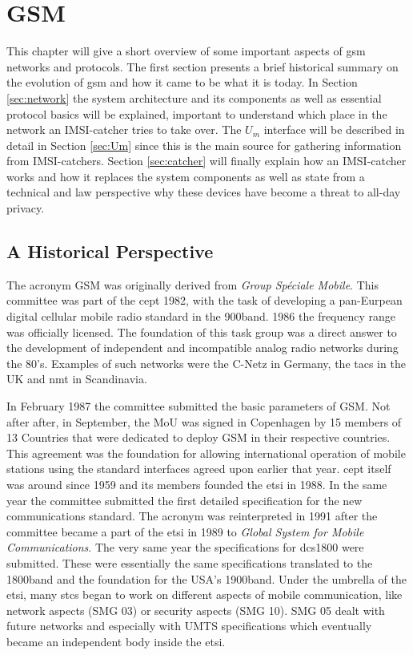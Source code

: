 \chapter{GSM}
\label{ch:gsm}
This chapter will give a short overview of some important aspects of \gls{gsm} networks and protocols.
The first section presents a brief historical summary on the evolution of \gls{gsm} and how it came to be what it is today.
In Section \ref{sec:network} the system architecture and its components as well as essential protocol basics will be explained, important to understand which place in the network an IMSI-catcher tries to take over.
The $U_m$ interface will be described in detail in Section \ref{sec:Um} since this is the main source for gathering information from IMSI-catchers.
Section \ref{sec:catcher} will finally explain how an IMSI-catcher works and how it replaces the system components as well as state from a technical and law perspective why these devices have become a threat to all-day privacy. 
 
\section{A Historical Perspective}
The acronym GSM was originally derived from \emph{Group Sp\'{e}ciale Mobile}.
This committee was part of the \gls{cept} 1982, with the task of developing a pan-Eurpean digital cellular mobile radio standard in the 900\MHz band.
1986 the frequency range was officially licensed.
The foundation of this task group was a direct answer to the development of independent and incompatible analog radio networks during the 80's.
Examples of such networks were the C-Netz in Germany, the \gls{tacs} in the UK and \gls{nmt} in Scandinavia.

In February 1987 the committee submitted the basic parameters of GSM. 
Not after after, in September, the \gls{MoU} was signed in Copenhagen by 15 members of 13 Countries that were dedicated to deploy GSM in their respective countries.
This agreement was the foundation for allowing international operation of mobile stations using the standard interfaces agreed upon earlier that year.
\gls{cept} itself was around since 1959 and its members founded the \gls{etsi} in 1988.
In the same year the committee submitted the first detailed specification for the new communications standard.
The acronym was reinterpreted in 1991 after the committee became a part of the \gls{etsi} in 1989 to \emph{Global System for Mobile Communications}.
The very same year the specifications for \gls{dcs1800} were submitted.
These were essentially the same specifications translated to the 1800\MHz band and the foundation for the USA's 1900\MHz band.
Under the umbrella of the \gls{etsi}, many \glspl{stc} began to work on different aspects of mobile communication, like network aspects (SMG 03) or security aspects (SMG 10).
SMG 05 dealt with future networks and especially with UMTS specifications which eventually became an independent body inside the \gls{etsi}.

